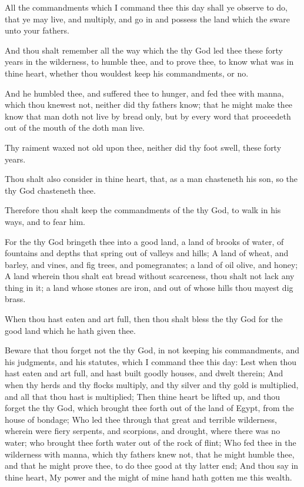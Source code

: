 \Chapter
\Verse All the commandments which I command thee this day shall ye observe to do, that ye may live, and multiply, and go in and possess the land which the \LORD sware unto your fathers.

\Verse And thou shalt remember all the way which the \LORD thy God led thee these forty years in the wilderness, to humble thee, and to prove thee, to know what was in thine heart, whether thou wouldest keep his commandments, or no.

\Verse And he humbled thee, and suffered thee to hunger, and fed thee with manna, which thou knewest not, neither did thy fathers know; that he might make thee know that man doth not live by bread only, but by every word that proceedeth out of the mouth of the \LORD doth man live.

\Verse Thy raiment waxed not old upon thee, neither did thy foot swell, these forty years.

\Verse Thou shalt also consider in thine heart, that, as a man chasteneth his son, so the \LORD thy God chasteneth thee.

\Verse Therefore thou shalt keep the commandments of the \LORD thy God, to walk in his ways, and to fear him.

\Verse For the \LORD thy God bringeth thee into a good land, a land of brooks of water, of fountains and depths that spring out of valleys and hills; \Verse A land of wheat, and barley, and vines, and fig trees, and pomegranates; a land of oil olive, and honey; \Verse A land wherein thou shalt eat bread without scarceness, thou shalt not lack any thing in it; a land whose stones are iron, and out of whose hills thou mayest dig brass.

\Verse When thou hast eaten and art full, then thou shalt bless the \LORD thy God for the good land which he hath given thee.

\Verse Beware that thou forget not the \LORD thy God, in not keeping his commandments, and his judgments, and his statutes, which I command thee this day: \Verse Lest when thou hast eaten and art full, and hast built goodly houses, and dwelt therein; \Verse And when thy herds and thy flocks multiply, and thy silver and thy gold is multiplied, and all that thou hast is multiplied; \Verse Then thine heart be lifted up, and thou forget the \LORD thy God, which brought thee forth out of the land of Egypt, from the house of bondage; \Verse Who led thee through that great and terrible wilderness, wherein were fiery serpents, and scorpions, and drought, where there was no water; who brought thee forth water out of the rock of flint; \Verse Who fed thee in the wilderness with manna, which thy fathers knew not, that he might humble thee, and that he might prove thee, to do thee good at thy latter end; \Verse And thou say in thine heart, My power and the might of mine hand hath gotten me this wealth.

